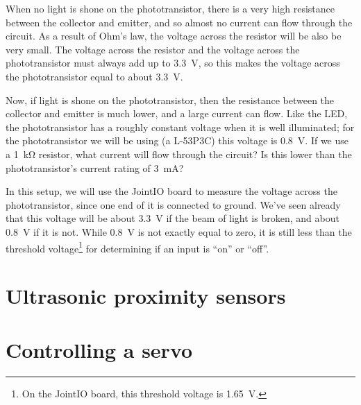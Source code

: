 \documentclass{article}
\begin{document}
When no light is shone on the phototransistor, there is a very high resistance
between the collector and emitter, and so almost no current can flow through
the circuit. As a result of Ohm's law, the voltage across the resistor will be
also be very small. The voltage across the resistor and the voltage across the
phototransistor must always add up to \SI{3.3}{\volt}, so this makes the
voltage across the phototransistor equal to about \SI{3.3}{\volt}.

Now, if light is shone on the phototransistor, then the resistance between the
collector and emitter is much lower, and a large current can flow. Like the LED,
the phototransistor has a roughly constant voltage when it is well illuminated;
for the phototransistor we will be using (a L-53P3C) this voltage is
\SI{0.8}{\volt}. If we use a \SI{1}{\kilo\ohm} resistor, what current will flow
through the circuit? Is this lower than the phototransistor's current rating of
\SI{3}{\milli\ampere}?

In this setup, we will use the JointIO board to measure the voltage across the
phototransistor, since one end of it is connected to ground. We've seen already
that this voltage will be about \SI{3.3}{\volt} if the beam of light is broken,
and about \SI{0.8}{\volt} if it is not. While \SI{0.8}{\volt} is not exactly
equal to zero, it is still less than the threshold voltage\footnote{On the
JointIO board, this threshold voltage is \SI{1.65}{\volt}.} for determining
if an input is ``on'' or ``off''.



\section{Ultrasonic proximity sensors}


\section{Controlling a servo}
\end{document}
